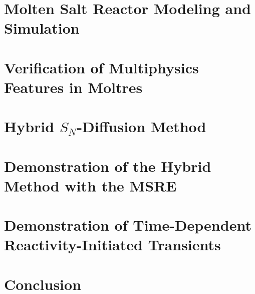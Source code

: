 \documentclass[11pt]{uiucthesis2021}
\newcounter{counterforappendices}
\begin{document}
\chapter{Molten Salt Reactor Modeling and Simulation}
\label{chap:lit}

\glsresetall

\chapter{Verification of Multiphysics Features in Moltres}
\label{chap:verification}

\glsresetall

\chapter{Hybrid $S_N$-Diffusion Method}
\label{chap:hybrid}

\glsresetall

\chapter{Demonstration of the Hybrid Method with the MSRE}
\label{chap:msre}

\glsresetall

\chapter{Demonstration of Time-Dependent Reactivity-Initiated Transients}
\label{chap:transient}

\glsresetall

\chapter{Conclusion}
\label{chap:conclusion}

\glsresetall

\backmatter

{
% 
\printbibliography[heading=bibintoc,title={References}]
}

\clearpage
\setcounter{counterforappendices}{\value{page}}
\mainmatter
\setcounter{page}{\value{counterforappendices}}
\appendix

\end{document}
